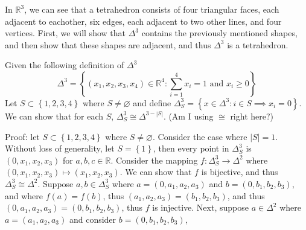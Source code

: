 \documentclass[11pt]{article}
\newcommand{\vertb}[1]{\left\vert#1\right\vert}      %
\newcommand{\braces}[1]{\left\{#1\right\}}           %
\newcommand{\R}{\mathbb{R}}
\begin{document}
\pagestyle{fancy}
\fancyhead{}

\normalsize

In $\R^3$, we can see that a tetrahedron consists of four triangular faces, each adjacent to eachother, six edges, each adjacent to two other lines, and four vertices. First, we will show that $\Delta^3$ contains the previously mentioned shapes, and then show that these shapes are adjacent, and thus $\Delta^3$ is a tetrahedron.

Given the following definition of $\Delta^3$
\[\Delta^3=\braces{(x_1,x_2,x_3,x_4)\in\mathbb{R}^4:\sum_{i=1}^{4}x_i=1\text{ and }x_i\geq0}\]
Let $S\subset\braces{1,2,3,4}$ where $S\ne\varnothing$ and define $\Delta^3_S=\braces{x\in\Delta^3:i\in S\implies x_i=0}$. We can show that for each $S$, $\Delta^3_S\cong\Delta^{3-\vertb{S}}$. (Am I using $\cong$ right here?)

Proof: let $S\subset\braces{1,2,3,4}$ where $S\ne\varnothing$. Consider the case where $\vertb{S}=1$. Without loss of generality, let $S=\braces{1}$, then every point in $\Delta^3_S$ is $(0,x_1,x_2,x_3)$ for $a,b,c\in\mathbb{R}$. Consider the mapping $f:\Delta^3_S\to\Delta^2$ where $(0,x_1,x_2,x_3)\mapsto(x_1,x_2,x_3)$. We can show that $f$ is bijective, and thus $\Delta^3_S\cong\Delta^2$. Suppose $a,b\in\Delta^3_S$ where $a=(0,a_1,a_2,a_3)$ and $b=(0,b_1,b_2,b_3)$, and where $f(a)=f(b)$, thus $(a_1,a_2,a_3)=(b_1,b_2,b_3)$, and thus $(0,a_1,a_2,a_3)=(0,b_1,b_2,b_3)$, thus $f$ is injective. Next, suppose $a\in\Delta^2$ where $a=(a_1,a_2,a_3)$ and consider $b=(0,b_1,b_2,b_3)$,
\end{document}
